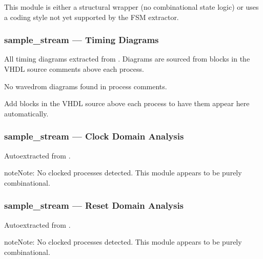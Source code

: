\documentclass[letterpaper,10pt,english]{sphinxmanual}
\begin{document}
\sphinxAtStartPar
This module is either a structural wrapper (no combinational
state logic) or uses a coding style not yet supported by the
FSM extractor.

\sphinxstepscope


\subsubsection{sample\_stream — Timing Diagrams}
\label{\detokenize{modules/sample_stream/timing:sample-stream-timing-diagrams}}\label{\detokenize{modules/sample_stream/timing::doc}}
\sphinxAtStartPar
All timing diagrams extracted from .
Diagrams are sourced from  blocks in the VHDL
source comments above each process.

\sphinxAtStartPar
No wavedrom diagrams found in process comments.

\sphinxAtStartPar
Add  blocks in the VHDL source above each
process to have them appear here automatically.

\sphinxstepscope


\subsubsection{sample\_stream — Clock Domain Analysis}
\label{\detokenize{modules/sample_stream/cdc:sample-stream-clock-domain-analysis}}\label{\detokenize{modules/sample_stream/cdc::doc}}
\sphinxAtStartPar
Auto\sphinxhyphen{}extracted from .

\begin{sphinxadmonition}{note}{Note:}
\sphinxAtStartPar
No clocked processes detected. This module appears to be purely combinational.
\end{sphinxadmonition}

\sphinxstepscope


\subsubsection{sample\_stream — Reset Domain Analysis}
\label{\detokenize{modules/sample_stream/reset:sample-stream-reset-domain-analysis}}\label{\detokenize{modules/sample_stream/reset::doc}}
\sphinxAtStartPar
Auto\sphinxhyphen{}extracted from .

\begin{sphinxadmonition}{note}{Note:}
\sphinxAtStartPar
No clocked processes detected. This module appears to be purely combinational.
\end{sphinxadmonition}
\end{document}

